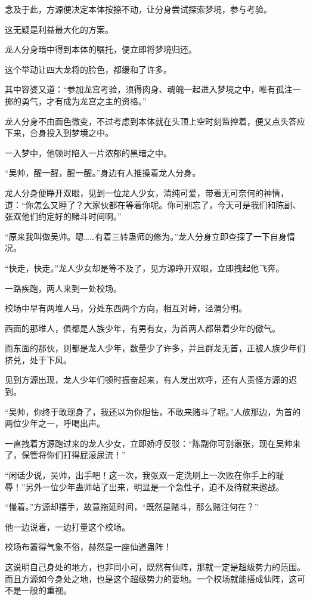 \begin{this_body}
念及于此，方源便决定本体按捺不动，让分身尝试探索梦境，参与考验。

这无疑是利益最大化的方案。

龙人分身暗中得到本体的嘱托，便立即将梦境归还。

这个举动让四大龙将的脸色，都缓和了许多。

其中容婆又道：“参加龙宫考验，须得肉身、魂魄一起进入梦境之中，唯有孤注一掷的勇气，才有成为龙宫之主的资格。”

龙人分身不由面色微变，不过考虑到本体就在头顶上空时刻监控着，便又点头答应下来，合身投入到梦境之中。

一入梦中，他顿时陷入一片浓郁的黑暗之中。

“吴帅，醒一醒，醒一醒。”身边有人推搡着龙人分身。

龙人分身便睁开双眼，见到一位龙人少女，清纯可爱，带着无可奈何的神情，道：“你怎么又睡了？大家伙都在等着你呢。你可别忘了，今天可是我们和陈副、张双他们约定好的赌斗时间啊。”

“原来我叫做吴帅。嗯……有着三转蛊师的修为。”龙人分身立即查探了一下自身情况。

“快走，快走。”龙人少女却是等不及了，见方源睁开双眼，立即拽起他飞奔。

一路疾跑，两人来到一处校场。

校场中早有两堆人马，分处东西两个方向，相互对峙，泾渭分明。

西面的那堆人，俱都是人族少年，有男有女，为首两人都带着少年的傲气。

而东面的那伙，则都是龙人少年，数量少了许多，并且群龙无首，正被人族少年们挤兑，处于下风。

见到方源出现，龙人少年们顿时振奋起来，有人发出欢呼，还有人责怪方源的迟到。

“吴帅，你终于敢现身了，我还以为你胆怯，不敢来赌斗了呢。”人族那边，为首的两位少年之一，呼喝出声。

一直拽着方源跑过来的龙人少女，立即娇呼反驳：“陈副你可别嚣张，现在吴帅来了，保管将你们打得屁滚尿流！”

“闲话少说，吴帅，出手吧！这一次，我张双一定洗刷上一次败在你手上的耻辱！”另外一位少年蛊师站了出来，明显是一个急性子，迫不及待就来邀战。

“慢着。”方源却摆手，故意拖延时间，“既然是赌斗，那么赌注何在？”

他一边说着，一边打量这个校场。

校场布置得气象不俗，赫然是一座仙道蛊阵！

这说明自己身处的地方，也非同小可，既然有仙阵，那就一定是超级势力的范围。而且方源如今身处之地，也是这个超级势力的要地。一个校场就能搭成仙阵，这可不是一般的重视。


\end{this_body}
